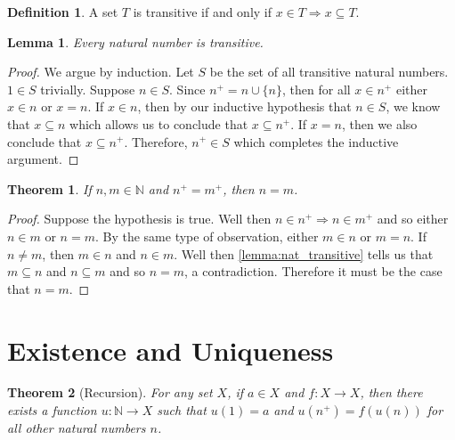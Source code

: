 \documentclass{article}
\theoremstyle{definition}
\newtheorem{definition}{Definition}[section]
\theoremstyle{definition}
\theoremstyle{plain}
\theoremstyle{remark}
\theoremstyle{plain}
\newtheorem{theorem}{Theorem}[section]
\theoremstyle{remark}
\theoremstyle{plain}
\newtheorem{lemma}{Lemma}[section]
\theoremstyle{plain}
\theoremstyle{plain}
\theoremstyle{plain}
\begin{document}
\begin{definition}
  A set \( T \) is transitive if and only if 
  \( x \in T \Rightarrow x \subseteq T \). 
\end{definition}

\begin{lemma}
  Every natural number is transitive.
  \label{lemma:nat_transitive}
\end{lemma}

\begin{proof}
  We argue by induction. 
  Let \( S \) be the set of all transitive natural numbers. \( 1 \in S \) 
  trivially. Suppose \( n \in S \). Since \( n^{+} = n \cup \{n\} \), then 
  for all \( x \in n^{+} \) either \( x \in n \) or \( x = n \). If 
  \( x \in n \), then 
  by our inductive hypothesis that \( n \in S \), we know that 
  \( x \subseteq n\) which allows us to conclude that \( x \subseteq n^{+} \). 
  If \( x = n \), then we also conclude that \( x \subseteq n^{+} \). 
  Therefore, \( n^{+} \in S \) which completes the inductive argument.
\end{proof}

\begin{theorem}
  If \( n, m \in \mathbb{N}\) and \( n^{+} = m^{+} \), then \( n = m \).
  \label{thm:fifth_peano_axiom}
\end{theorem}

\begin{proof}
  Suppose the hypothesis is true. Well then 
  \( n \in n^{+} \Rightarrow n \in m^{+} \) and so either \( n \in m \) or 
  \( n = m \). By the same type of observation, either \( m \in n \) or \( m = n \). 
  If \( n \neq m\), then \( m \in n \) and \( n \in m \). 
  Well then \autoref{lemma:nat_transitive} tells us that 
  \( m \subseteq n \) and \( n \subseteq m \) and so \( n = m \), a 
  contradiction. Therefore it must be the case that \( n = m \).
\end{proof}

\section{Existence and Uniqueness}

\begin{theorem}[Recursion]
  For any set \( X \), if \( a \in X \) and \( f : X \rightarrow X \), then 
  there exists a function \( u: \mathbb{N} \rightarrow X \) such that 
  \( u(1) = a \) and \( u(n^{+}) = f(u(n)) \) for all other natural numbers 
  \( n \). 
  \label{recursion}
\end{theorem}
\end{document}
